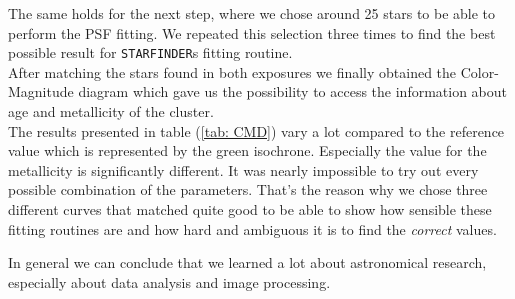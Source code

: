 \begin{description}
	The same holds for the next step, where we chose around 25 stars to be able to perform the PSF fitting. We repeated this selection three times to find the best possible result for \texttt{STARFINDER}s fitting routine. \\
	After matching the stars found in both exposures we finally obtained the Color-Magnitude diagram which gave us the possibility to access the information about age and metallicity of the cluster. \\
	The results presented in table (\ref{tab: CMD}) vary a lot compared to the reference value which is represented by the green isochrone. Especially the value for the metallicity is significantly different. It was nearly impossible to try out every possible combination of the parameters. That's the reason why we chose three different curves that matched quite good to be able to show how sensible these fitting routines are and how hard and ambiguous it is to find the \textit{correct} values.\\ 

\end{description}
In general we can conclude that we learned a lot about astronomical research, especially about data analysis and image processing. 